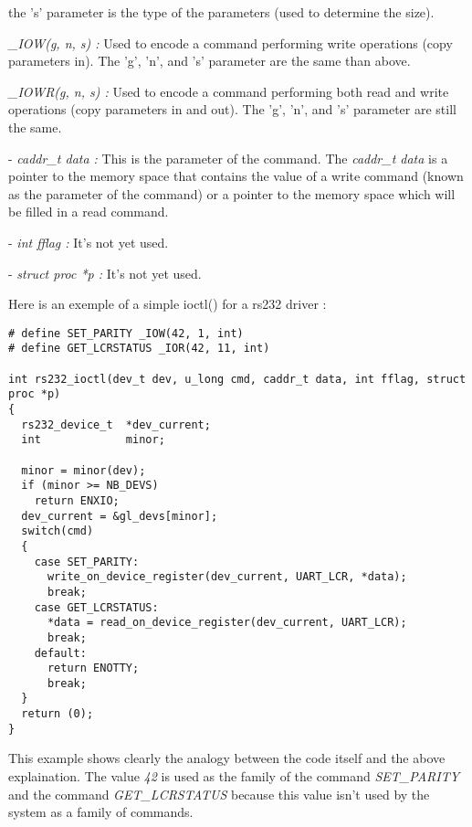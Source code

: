 \documentclass[11pt]{report}
\begin{document}
\begin{description}
{\begin{description}
{      the 's' parameter is the type of the parameters (used to determine the size).}
      \item{{\it \_IOW(g, n, s) :} Used to encode a command performing write
      operations (copy parameters in). The 'g', 'n', and 's' parameter are the same than
      above.}
      \item{{\it \_IOWR(g, n, s) :} Used to encode a command performing both read and
      write operations (copy parameters in and out). The 'g', 'n', and 's' parameter
      are still the same.}
    \end{description}}
  \item{- {\it caddr\_t data :} This is the parameter of the command. The {\it caddr\_t
data} is a pointer to the memory space that contains the value of a write command
(known as the parameter of the command) or a pointer to the memory space which
will be filled in a read command.}
  \item{- {\it int fflag :} It's not yet used.}
  \item{- {\it struct proc *p :} It's not yet used.}
\end{description}
Here is an exemple of a simple ioctl() for a rs232 driver :
\begin{lstlisting}
# define SET_PARITY _IOW(42, 1, int)
# define GET_LCRSTATUS _IOR(42, 11, int)

int rs232_ioctl(dev_t dev, u_long cmd, caddr_t data, int fflag, struct proc *p)
{
  rs232_device_t  *dev_current;
  int             minor;

  minor = minor(dev);
  if (minor >= NB_DEVS)
    return ENXIO;
  dev_current = &gl_devs[minor];
  switch(cmd)
  {
    case SET_PARITY:
      write_on_device_register(dev_current, UART_LCR, *data);
      break;
    case GET_LCRSTATUS:
      *data = read_on_device_register(dev_current, UART_LCR);
      break;
    default:
      return ENOTTY;
      break;
  }
  return (0);
}
\end{lstlisting}
This example shows clearly the analogy between the code itself and the above
explaination. The value {\it 42} is used as the family of the command {\it SET\_PARITY}
and the command {\it GET\_LCRSTATUS} because this value isn't used by the system as a
family of commands.
\end{document}
